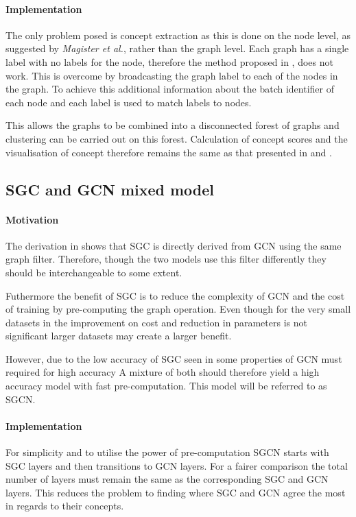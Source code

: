 \paragraph{Implementation}
The only problem posed is concept extraction as this is done on the node level, as suggested by \textit{Magister et al.}, rather than the graph level.
Each graph has a single label with no labels for the node, therefore the method proposed in , does not work.
This is overcome by broadcasting the graph label to each of the nodes in the graph.
To achieve this additional information about the batch identifier of each node and each label is used to match labels to nodes.

This allows the graphs to be combined into a disconnected forest of graphs and clustering can be carried out on this forest.
Calculation of concept scores and the visualisation of concept therefore remains the same as that presented in  and .

\subsection{SGC and GCN mixed model}
\label{sec:SGCN}
\paragraph{Motivation}
The derivation in  shows that SGC is directly derived from GCN using the same graph filter.
Therefore, though the two models use this filter differently they should be interchangeable to some extent.

Futhermore the benefit of SGC is to reduce the complexity of GCN and the cost of training by pre-computing the graph operation.
Even though for the very small datasets in  the improvement on cost and reduction in parameters is not significant larger datasets may create a larger benefit.

However, due to the low accuracy of SGC seen in  some properties of GCN must required for high accuracy 
A mixture of both should therefore yield a high accuracy model with fast pre-computation.
This model will be referred to as SGCN.

\paragraph{Implementation}
For simplicity and to utilise the power of pre-computation SGCN starts with SGC layers and then transitions to GCN layers.
For a fairer comparison the total number of layers must remain the same as the corresponding SGC and GCN layers.
This reduces the problem to finding where SGC and GCN agree the most in regards to their concepts.

